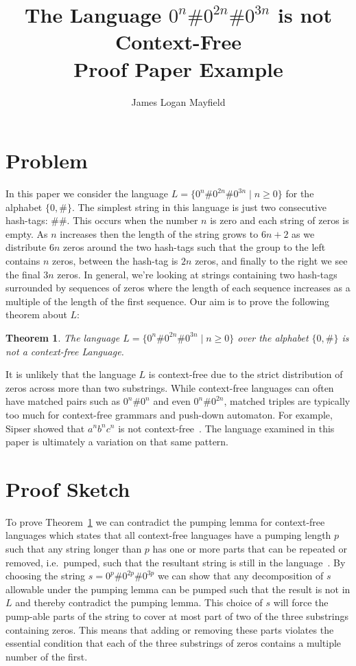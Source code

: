 \documentclass[10pt]{article}
\title{ The Language $0^n\#0^{2n}\#0^{3n}$ is not Context-Free \\ \small{Proof Paper Example} }
\author{James Logan Mayfield}
\newtheorem{theorem}{Theorem}
\theoremstyle{definition}
\begin{document}
\maketitle

\section{ Problem }

In this paper we consider the language $L = \lbrace 0^n\#0^{2n}\#0^{3n} \mid n \geq 0 \rbrace$ for the alphabet $\lbrace 0,\# \rbrace$. The simplest string in this language is just two consecutive hash-tags: $\# \#$. This occurs when the number $n$ is zero and each string of zeros is empty. As $n$ increases then the length of the string grows to $6n+2$ as we distribute $6n$ zeros around the two  hash-tags such that the group to the left contains $n$ zeros, between the hash-tag is $2n$ zeros, and finally to the right we see the final $3n$ zeros. In general, we're looking at strings containing two hash-tags surrounded by sequences of zeros where the length of each sequence increases as a multiple of the length of the first sequence. Our aim is to prove the following theorem about $L$:

\begin{theorem}
The language $L = \lbrace 0^n\#0^{2n}\#0^{3n} \mid n \geq 0 \rbrace$ over the alphabet $\lbrace 0,\# \rbrace$ is not a context-free Language.
\label{th}
\end{theorem}

It is unlikely that the language $L$ is context-free due to the strict distribution of zeros across more than two substrings.  While context-free languages can often have matched pairs such as $0^n\# 0^n$ and even $0^n \# 0^{2n}$, matched triples are typically too much for context-free grammars and push-down automaton. For example, Sipser showed that $a^{n}b^{n}c^{n}$ is not context-free~\cite{Sipser}. The language examined in this paper is ultimately a variation on that same pattern.

\section{ Proof Sketch }

To prove Theorem~\ref{th} we can contradict the pumping lemma for context-free languages which states that all context-free languages have a pumping length $p$ such that any string longer than $p$ has one or more parts that can be repeated or removed, i.e.\ pumped, such that the resultant string is still in the language~\cite{Sipser}. By choosing the string $s = 0^p\#0^{2p}\#0^{3p}$ we can show that any decomposition of $s$ allowable under the pumping lemma can be pumped such that the result is not in $L$ and thereby contradict the pumping lemma. This choice of $s$ will force the pump-able parts of the string to cover at most part of two of the three substrings containing zeros. This means that adding or removing these parts violates the essential condition that each of the three substrings of zeros contains a multiple number of the first.
\end{document}
